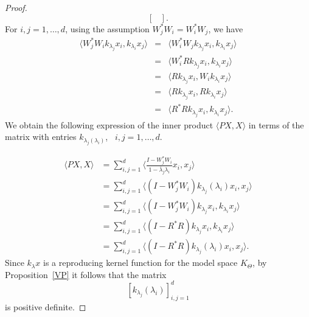 \documentclass{amsart}
\theoremstyle{definition}
\def\nn{\nonumber}
\def\ben{\begin{eqnarray}}
\def\eeqn{\end{eqnarray}}
\begin{document}
\begin{proof}
$$\begin{bmatrix}
    \end{bmatrix}.$$
For $i,j=1,\dots,d$, using the assumption $W_j^*W_i=W_i^*W_j$,  we have
\ben \langle W_j^*W_i k_{\lambda_j}x_i, k_{\lambda_i} x_j\rangle&=&\langle W_i^*W_jk_{\lambda_j}x_i, k_{\lambda_i} x_j\rangle\nn\\
&=&\langle W_i^*R k_{\lambda_j} x_i,k_{\lambda_i} x_j\rangle\nn\\
&=&\langle R k_{\lambda_j}x_i, W_i k_{\lambda_i} x_j\rangle\nn\\
&=&\langle R k_{\lambda_j}x_i, R k_{\lambda_i} x_j\rangle\nn\\
&=&\langle R^*R k_{\lambda_j}x_i, k_{\lambda_i} x_j\rangle.\nn\eeqn  
We obtain the following expression of the inner product $\langle PX, X\rangle$ in terms of the  matrix with entries 
$k_{\lambda_j(\lambda_i)}$, \, $i,j=1,\dots,d$.
 
\begin{align*}
    \langle PX, X\rangle 
%
&=\sum_{i,j=1}^d\Big\langle \frac{I-W^*_jW_i}{1-\overline{\lambda}_j\lambda_i}x_i, x_j\Big\rangle\\
&=\sum_{i,j=1}^d\langle (I-W^*_jW_i)k_{\lambda_j}(\lambda_i)x_i, x_j\rangle\\
&=\sum_{i,j=1}^d\langle (I-W^*_jW_i)k_{\lambda_j}x_i, k_{\lambda_i}x_j\rangle\\
&=\sum_{i,j=1}^d\langle (I-R^*R)k_{\lambda_j}x_i, k_{\lambda_i}x_j\rangle\\
&=\sum_{i,j=1}^d\langle (I-R^*R)k_{\lambda_j}(\lambda_i)x_i, x_j\rangle.
\end{align*}
Since $k_{\lambda}x$ is a reproducing kernel function for the model space $K_\Theta$, by Proposition~\ref{VP} it follows that the matrix
$$[k_{\lambda_j}(\lambda_i)]_{i,j=1}^d$$
is positive definite.
\medskip


\end{proof}
\end{document}
